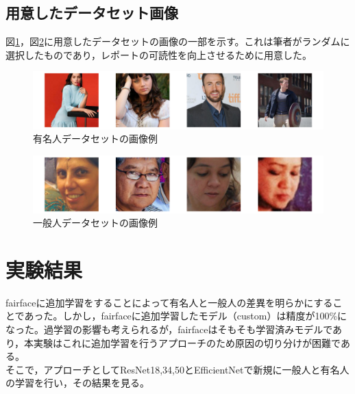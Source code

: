 \documentclass[a4paper,11pt,titlepage]{jsarticle}
\begin{document}


\subsection{用意したデータセット画像}
図\ref{fig:good_ex}，図\ref{fig:normal_ex}に用意したデータセットの画像の一部を示す。これは筆者がランダムに選択したものであり，レポートの可読性を向上させるために用意した。
\begin{figure}[htbp]
    \centering
    \includegraphics[width=1.1\textwidth]{ex_good_dataset.png}
    \caption{有名人データセットの画像例}
    \label{fig:good_ex}
\end{figure}
\begin{figure}[H]
    \centering
    \includegraphics[width=1.1\textwidth]{ex_normal_dataset.png}
    \caption{一般人データセットの画像例}
    \label{fig:normal_ex}
\end{figure}


\section{実験結果}
fairfaceに追加学習をすることによって有名人と一般人の差異を明らかにすることであった。しかし，fairfaceに追加学習したモデル（custom）は精度が100\%になった。過学習の影響も考えられるが，fairfaceはそもそも学習済みモデルであり，本実験はこれに追加学習を行うアプローチのため原因の切り分けが困難である。\\
そこで，アプローチとしてResNet18,34,50とEfficientNetで新規に一般人と有名人の学習を行い，その結果を見る。
\end{document}
